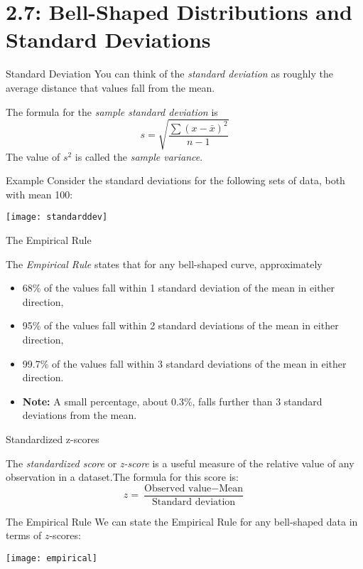\documentclass[Lecture.tex]{subfiles}
\begin{document}
\section{2.7: Bell-Shaped Distributions and Standard Deviations}

\begin{frame}{Standard Deviation}
You can think of the {\it standard deviation} as roughly the average distance that values fall from the mean.
\begin{defn}
The formula for the {\it sample standard deviation} is $$s=\sqrt{\frac{\sum(x-\bar x)^2}{n-1}}$$\pause
The value of $s^2$ is called the {\it sample variance}.
\end{defn}
\end{frame}

\begin{frame}{Example}
Consider the standard deviations for the following sets of data, both with mean 100:\pause
\begin{center}
\texttt{[image: standarddev]}
\end{center}
\end{frame}

\begin{frame}{The Empirical Rule}
\begin{defn}
The {\it Empirical Rule} states that for any bell-shaped curve, approximately\pause
\begin{itemize}
\item<1->
68\% of the values fall within 1 standard deviation of the mean in either direction,
\item<2->
95\% of the values fall within 2 standard deviations of the mean in either direction,
\item<3->
99.7\% of the values fall within 3 standard deviations of the mean in either direction.
\item<4->
{\bf Note:} A small percentage, about 0.3\%, falls further than 3 standard deviations from the mean.
\end{itemize}
\end{defn}
\end{frame}

\begin{frame}{Standardized z-scores}
\begin{defn}
The {\it standardized score} or {\it z-score} is a useful measure of the relative value of any observation in a dataset.\pause The formula for this score is: $$z=\frac{{\text{Observed value}}-{\text{Mean}}}{{\text{Standard deviation}}}$$
\end{defn}
\end{frame}

\begin{frame}{The Empirical Rule}
We can state the Empirical Rule for any bell-shaped data in terms of $z$-scores:\pause
\begin{center}
\texttt{[image: empirical]}
\end{center}
\end{frame}
\end{document}
